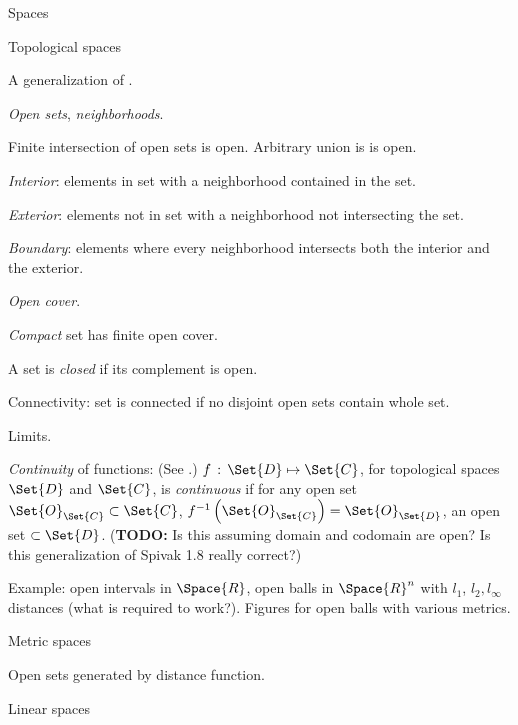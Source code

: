 \begin{plSection}{Spaces}
\begin{plSection}{Topological spaces}
\label{sec:Topological-spaces}

A generalization of
.

\textit{Open sets}, \textit{neighborhoods}.

Finite intersection of open sets is open.
Arbitrary union is is open. 

\textit{Interior}: elements in set 
with a neighborhood contained
in the set.

\textit{Exterior}: elements not in set
with a neighborhood not intersecting the set.

\textit{Boundary}: elements where every neighborhood
intersects both the interior and the exterior.

\textit{Open cover}. 

\textit{Compact} set has finite open cover.

A set is \textit{closed} if its complement is open.

Connectivity: set is connected if no disjoint open sets contain
whole set.

Limits.

\textit{Continuity} of functions: 
(See .)
$f \, : \, \Set{D} \mapsto \Set{C}$,
for topological spaces $\Set{D}$ and $\Set{C}$,
is \textit{continuous}
if for any open set $\Set{O}_{\Set{C}} \subset \Set{C}$,
$f^{-1}\left( \Set{O}_{\Set{C}} \right) = 
\Set{O}_{\Set{D}}$, an open set $\subset \Set{D}$.
(\textbf{TODO:} Is this assuming domain and codomain are open?
Is this generalization of Spivak 1.8 really correct?)

Example: open intervals in $\Space{R}$,
open balls in $\Space{R}^n$ with $l_1$, $l_2, l_{\infty}$ distances
(what is required to work?).
Figures for open balls with various metrics.

\end{plSection}%
\begin{plSection}{Metric spaces}
\label{sec:Metric-spaces}

Open sets generated by distance function.

\end{plSection}%
\begin{plSection}{Linear spaces}
\label{sec:Linear-spaces}


\end{plSection}
\end{plSection}
